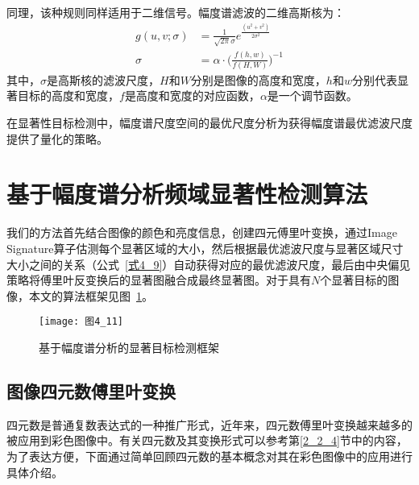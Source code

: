 同理，该种规则同样适用于二维信号。幅度谱滤波的二维高斯核为：
\begin{align}
g(u,v;\sigma) &= \frac{1}{\sqrt{2\pi}\sigma}e^{\frac{(u^{2}+v^{2})}{2\sigma^{2}}}\label{式4_8}\\
\sigma &= \alpha\cdot\Big(\frac{f(h,w)}{f(H,W)}\Big)^{-1}\label{式4_9}
\end{align}
其中，$\sigma$是高斯核的滤波尺度，$H$和$W$分别是图像的高度和宽度，$h$和$w$分别代表显著目标的高度和宽度，$f$是高度和宽度的对应函数，$\alpha$是一个调节函数。

在显著性目标检测中，幅度谱尺度空间的最优尺度分析为获得幅度谱最优滤波尺度提供了量化的策略。

\section{基于幅度谱分析频域显著性检测算法}
\label{4_2}

我们的方法首先结合图像的颜色和亮度信息，创建四元傅里叶变换，通过Image Signature算子估测每个显著区域的大小，然后根据最优滤波尺度与显著区域尺寸大小之间的关系（公式~\ref{式4_9}）自动获得对应的最优滤波尺度，最后由中央偏见策略\cite{JuddMIT2012Benchmark}将傅里叶反变换后的显著图融合成最终显著图。对于具有$N$个显著目标的图像，本文的算法框架见图~\ref{图4_11}。
\begin{figure}[h]
  \centering
  \texttt{[image: 图4\_11]}
  \caption{基于幅度谱分析的显著目标检测框架}   
  \label{图4_11} 
\end{figure}

\subsection{图像四元数傅里叶变换}
\label{4_2_1}

四元数是普通复数表达式的一种推广形式\cite{Hamilton1866book}，近年来，四元数傅里叶变换越来越多的被应用到彩色图像中\cite{EllPhD1992Hypercomplex}。有关四元数及其变换形式可以参考第\ref{2_2_4}节中的内容，为了表达方便，下面通过简单回顾四元数的基本概念对其在彩色图像中的应用进行具体介绍。

